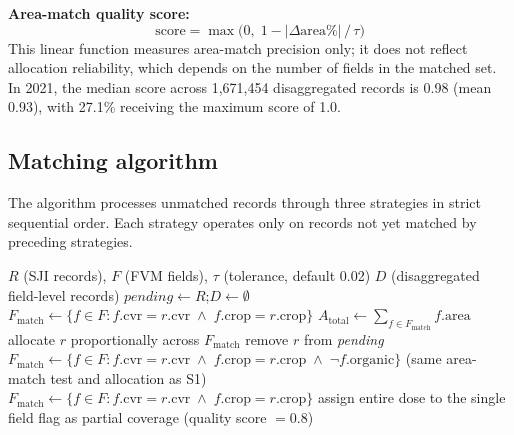 \documentclass[12pt,a4paper]{article}
\begin{document}
\noindent\textbf{Area-match quality score:}
\[
\text{score} = \max\!\big(0,\; 1 - |\Delta\text{area}\%| \,/\, \tau\big)
\]
This linear function measures area-match precision only; it does not reflect allocation reliability, which depends on the number of fields in the matched set. In 2021, the median score across 1,671,454 disaggregated records is 0.98 (mean 0.93), with 27.1\% receiving the maximum score of 1.0.

\subsection{Matching algorithm}

The algorithm processes unmatched records through three strategies in strict sequential order. Each strategy operates only on records not yet matched by preceding strategies.

\begin{algorithm}[H]
\caption{Pesticide disaggregation via sequential area matching.}
\label{alg:disagg}
\begin{algorithmic}[1]
\Require $R$ (SJI records), $F$ (FVM fields), $\tau$ (tolerance, default 0.02)
\Ensure $D$ (disaggregated field-level records)
\State $\textit{pending} \gets R$;\quad $D \gets \emptyset$
\Statex
{}
    \State $F_{\text{match}} \gets \{f \in F : f.\text{cvr} = r.\text{cvr} \;\wedge\; f.\text{crop} = r.\text{crop}\}$
    \State $A_{\text{total}} \gets \sum_{f \in F_{\text{match}}} f.\text{area}$
        \State allocate $r$ proportionally across $F_{\text{match}}$
        \State remove $r$ from \textit{pending}
    \EndIf
\EndFor
\Statex
{}
    \State $F_{\text{match}} \gets \{f \in F : f.\text{cvr} = r.\text{cvr} \;\wedge\; f.\text{crop} = r.\text{crop} \;\wedge\; \lnot f.\text{organic}\}$
    \State (same area-match test and allocation as S1)
\EndFor
\Statex
{}
    \State $F_{\text{match}} \gets \{f \in F : f.\text{cvr} = r.\text{cvr} \;\wedge\; f.\text{crop} = r.\text{crop}\}$
        \State assign entire dose to the single field
        \State flag as partial coverage (quality score $= 0.8$)
    \EndIf
\EndFor
\end{algorithmic}
\end{algorithm}
\end{document}
